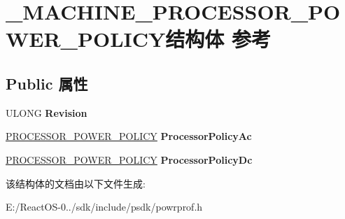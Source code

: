 \hypertarget{struct___m_a_c_h_i_n_e___p_r_o_c_e_s_s_o_r___p_o_w_e_r___p_o_l_i_c_y}{}\section{\+\_\+\+M\+A\+C\+H\+I\+N\+E\+\_\+\+P\+R\+O\+C\+E\+S\+S\+O\+R\+\_\+\+P\+O\+W\+E\+R\+\_\+\+P\+O\+L\+I\+C\+Y结构体 参考}
\label{struct___m_a_c_h_i_n_e___p_r_o_c_e_s_s_o_r___p_o_w_e_r___p_o_l_i_c_y}
\subsection*{Public 属性}
\begin{DoxyCompactItemize}
\item 
\mbox{\label{struct___m_a_c_h_i_n_e___p_r_o_c_e_s_s_o_r___p_o_w_e_r___p_o_l_i_c_y_a3624418932e8851075a74d3f328ebf03}} 
U\+L\+O\+NG {\bfseries Revision}
\item 
\mbox{\label{struct___m_a_c_h_i_n_e___p_r_o_c_e_s_s_o_r___p_o_w_e_r___p_o_l_i_c_y_af888befe095bbbf3654dfed46099a882}} 
\hyperlink{struct___p_r_o_c_e_s_s_o_r___p_o_w_e_r___p_o_l_i_c_y}{P\+R\+O\+C\+E\+S\+S\+O\+R\+\_\+\+P\+O\+W\+E\+R\+\_\+\+P\+O\+L\+I\+CY} {\bfseries Processor\+Policy\+Ac}
\item 
\mbox{\label{struct___m_a_c_h_i_n_e___p_r_o_c_e_s_s_o_r___p_o_w_e_r___p_o_l_i_c_y_ab8e5586c5f6584ee8a93de4c8621d978}} 
\hyperlink{struct___p_r_o_c_e_s_s_o_r___p_o_w_e_r___p_o_l_i_c_y}{P\+R\+O\+C\+E\+S\+S\+O\+R\+\_\+\+P\+O\+W\+E\+R\+\_\+\+P\+O\+L\+I\+CY} {\bfseries Processor\+Policy\+Dc}
\end{DoxyCompactItemize}


该结构体的文档由以下文件生成\+:\begin{DoxyCompactItemize}
\item 
E\+:/\+React\+O\+S-\/0../sdk/include/psdk/powrprof.\+h\end{DoxyCompactItemize}
